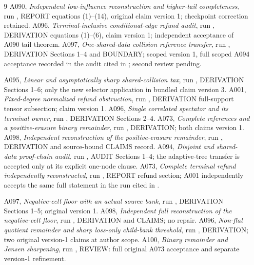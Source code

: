 \documentclass[11pt]{article}
\begin{document}
\begin{thebibliography}{9}
 A090, \emph{Independent low-influence reconstruction and higher-tail completeness},
run ,
REPORT equations (1)--(14), original claim version 1; checkpoint correction retained.
 A096, \emph{Terminal-inclusive conditional-edge refund audit},
run ,
DERIVATION equations (1)--(6), claim version 1; independent acceptance of A090 tail theorem.
 A097, \emph{One-shared-data collision reference transfer},
run ,
DERIVATION Sections 1--4 and BOUNDARY; scoped version 1, full scoped A094
acceptance recorded in the audit cited in \cite{A094d}; second review pending.


 A095, \emph{Linear and asymptotically sharp shared-collision tax},
run ,
DERIVATION Sections 1--6; only the new selector application in bundled claim version 3.
 A001, \emph{Fixed-degree normalized refund obstruction},
run ,
DERIVATION full-support tensor subsection; claim version 1.
 A096, \emph{Single correlated spectator and its terminal owner},
run , DERIVATION Sections 2--4.
 A073, \emph{Complete references and a positive-erasure binary remainder},
run , DERIVATION; both claims version 1.
 A098, \emph{Independent reconstruction of the positive-erasure remainder},
run , DERIVATION and source-bound CLAIMS record.
 A094, \emph{Disjoint and shared-data proof-chain audit},
run , AUDIT Sections 1--4;
the adaptive-tree transfer is accepted only at its explicit one-node clause.
 A073, \emph{Complete terminal refund independently reconstructed},
run , REPORT refund section;
A001 independently accepts the same full statement in the run cited in \cite{A001d}.


 A097, \emph{Negative-cell floor with an actual source bank},
run , DERIVATION Sections 1--5; original version 1.
 A098, \emph{Independent full reconstruction of the negative-cell floor},
run , DERIVATION and CLAIMS; no repair.
 A096, \emph{Non-flat quotient remainder and sharp loss-only child-bank threshold},
run , DERIVATION; two original version-1 claims at author scope.
 A100, \emph{Binary remainder and Jensen sharpening},
run , REVIEW: full original A073 acceptance and separate version-1 refinement.
\end{thebibliography}
\end{document}

